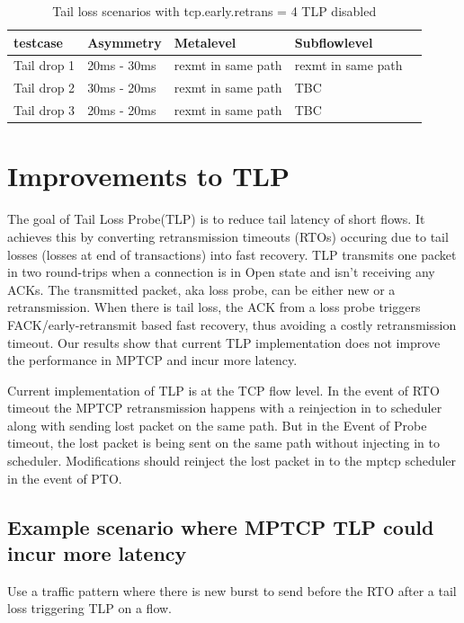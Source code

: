 \documentclass[12pt,draftcls,onecolumn]{IEEEtran}
\begin{document}
\begin{table}[!ht]
\centering
\caption{Tail loss scenarios with tcp.early.retrans = 4 TLP disabled}
\label{ret4}
\begin{tabular}{|l|l|l|l|l|}
\hline
 testcase   & Asymmetry   & Metalevel          & Subflowlevel       &  \\\hline
Tail drop 1 & 20ms - 30ms & rexmt in same path & rexmt in same path &  \\\hline
Tail drop 2 & 30ms - 20ms & rexmt in same path & TBC                &  \\\hline
Tail drop 3 & 20ms - 20ms & rexmt in same path & TBC                & \\ \hline
\end{tabular}
\end{table}


\section{Improvements to TLP}
The goal of Tail Loss Probe(TLP) is to reduce tail latency of short flows. It achieves this by converting retransmission timeouts (RTOs) occuring due to tail losses (losses at end of transactions) into fast recovery. TLP transmits one packet in two round-trips when a connection is in Open state and isn't receiving any ACKs. The transmitted packet, aka loss probe, can be either new or a retransmission. When there is tail loss, the ACK from a loss probe triggers FACK/early-retransmit based fast recovery, thus avoiding a costly retransmission timeout. Our results show that current TLP implementation does not improve the performance in MPTCP and incur more latency.

Current implementation of TLP is at the TCP flow level. In the event of RTO timeout the MPTCP retransmission happens with a reinjection in to scheduler along with sending lost packet on the same path. But in the Event of Probe timeout, the lost packet is being sent on the same path without injecting in to scheduler.  Modifications should reinject the lost packet in to the mptcp scheduler in the event of PTO.

\subsection{Example scenario where MPTCP TLP could incur more latency}

Use a traffic pattern where there is new burst to send before the RTO after a tail loss triggering TLP on a flow.
\end{document}
